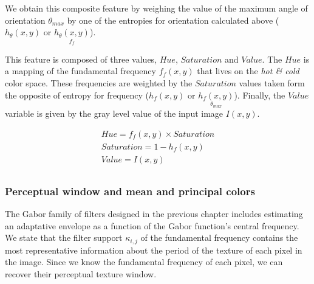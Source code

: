 We obtain this composite feature by weighing the value of the maximum angle of orientation $\theta_{max}$ by one of the entropies for orientation calculated above ($h_{\theta}(x,y)$ or $\underset{f_{f}}{h_{\theta}(x,y)}$).

This feature is composed of three values, $Hue$, $Saturation$ and $Value$. The $Hue$ is a mapping of the fundamental frequency $f_f(x,y)$ that lives on the \textit{hot \& cold} color space. These frequencies are weighted by the $Saturation$ values taken form the opposite of entropy for frequency ($h_{f}(x,y)$ or $\underset{\theta_{max}}{h_{f}(x,y)}$). Finally, the $Value$ variable is given by the gray level value of the input image $I(x,y)$.

\begin{gather}
    Hue = f_f(x,y) \times Saturation \\
    Saturation = 1 - h_{f} (x,y) \\
    Value = I(x,y) \\
\end{gather}

\subsubsection{Perceptual window and mean and principal colors}
The Gabor family of filters designed in the previous chapter includes estimating an adaptative envelope as a function of the Gabor function's central frequency. We state that the filter support $\kappa_{i,j}$ of the fundamental frequency contains the most representative information about the period of the texture of each pixel in the image. Since we know the fundamental frequency of each pixel, we can recover their perceptual texture window.